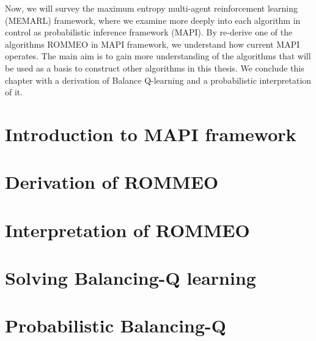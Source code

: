 \label{chapter:chap3}

\begin{miniabstract}
Now, we will survey the maximum entropy multi-agent reinforcement learning (MEMARL) framework, where we examine more deeply into each algorithm in control as probabilistic inference framework (MAPI). By re-derive one of the algorithms ROMMEO \cite{tian2019regularized} in MAPI framework, we understand how current MAPI operates. The main aim is to gain more understanding of the algorithms that will be used as a basis to construct other algorithms in this thesis. We conclude this chapter with a derivation of Balance Q-learning \cite{grau2018balancing} and a probabilistic interpretation of it.
\end{miniabstract}


\section{Introduction to MAPI framework}


\section{Derivation of ROMMEO}


\section{Interpretation of ROMMEO}


\section{Solving Balancing-Q learning}


\section{Probabilistic Balancing-Q}
